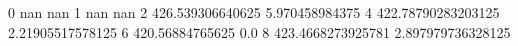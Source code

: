 0 nan nan
1 nan nan
2 426.539306640625 5.970458984375
4 422.78790283203125 2.21905517578125
6 420.56884765625 0.0
8 423.4668273925781 2.897979736328125
